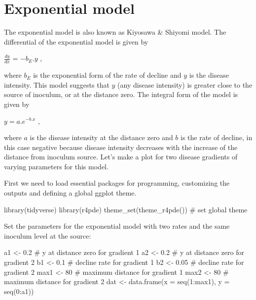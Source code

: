 \documentclass[
  letterpaper,
]{book}
\newenvironment{Shaded}{\begin{snugshade}}{\end{snugshade}}
\newcommand{\AttributeTok}[1]{\textcolor[rgb]{0.40,0.45,0.13}{#1}}
\newcommand{\CommentTok}[1]{\textcolor[rgb]{0.37,0.37,0.37}{#1}}
\newcommand{\DecValTok}[1]{\textcolor[rgb]{0.68,0.00,0.00}{#1}}
\newcommand{\FloatTok}[1]{\textcolor[rgb]{0.68,0.00,0.00}{#1}}
\newcommand{\FunctionTok}[1]{\textcolor[rgb]{0.28,0.35,0.67}{#1}}
\newcommand{\NormalTok}[1]{\textcolor[rgb]{0.00,0.23,0.31}{#1}}
\newcommand{\OtherTok}[1]{\textcolor[rgb]{0.00,0.23,0.31}{#1}}
\newcommand{\SpecialCharTok}[1]{\textcolor[rgb]{0.37,0.37,0.37}{#1}}
\begin{document}
\hypertarget{exponential-model}{%
\section{Exponential model}\label{exponential-model}}

The exponential model is also known as Kiyosawa \& Shiyomi model. The
differential of the exponential model is given by

\(\frac{dy}{dx}\) = \(-b_{E}.y\) ,

where \(b_{E}\) is the exponential form of the rate of decline and \(y\)
is the disease intensity. This model suggests that \(y\) (any disease
intensity) is greater close to the source of inoculum, or at the
distance zero. The integral form of the model is given by

\(y = a . e^{-b.x}\) ,

where \(a\) is the disease intensity at the distance zero and \(b\) is
the rate of decline, in this case negative because disease intensity
decreases with the increase of the distance from inoculum source. Let's
make a plot for two disease gradients of varying parameters for this
model.

First we need to load essential packages for programming, customizing
the outputs and defining a global ggplot theme.

\begin{Shaded}
\begin{Highlighting}[]
\FunctionTok{library}\NormalTok{(tidyverse)}
\FunctionTok{library}\NormalTok{(r4pde)}
\FunctionTok{theme\_set}\NormalTok{(}\FunctionTok{theme\_r4pde}\NormalTok{()) }\CommentTok{\# set global theme}
\end{Highlighting}
\end{Shaded}

Set the parameters for the exponential model with two rates and the same
inoculum level at the source:

\begin{Shaded}
\begin{Highlighting}[]
\NormalTok{a1 }\OtherTok{\textless{}{-}} \FloatTok{0.2} \CommentTok{\# y at distance zero for gradient 1}
\NormalTok{a2 }\OtherTok{\textless{}{-}} \FloatTok{0.2} \CommentTok{\# y at distance zero for gradient 2}
\NormalTok{b1 }\OtherTok{\textless{}{-}} \FloatTok{0.1} \CommentTok{\# decline rate for gradient 1}
\NormalTok{b2 }\OtherTok{\textless{}{-}} \FloatTok{0.05} \CommentTok{\# decline rate for gradient 2}
\NormalTok{max1 }\OtherTok{\textless{}{-}} \DecValTok{80} \CommentTok{\# maximum distance for gradient 1}
\NormalTok{max2 }\OtherTok{\textless{}{-}} \DecValTok{80} \CommentTok{\# maximum distance for gradient 2}
\NormalTok{dat }\OtherTok{\textless{}{-}} \FunctionTok{data.frame}\NormalTok{(}\AttributeTok{x =} \FunctionTok{seq}\NormalTok{(}\DecValTok{1}\SpecialCharTok{:}\NormalTok{max1), }\AttributeTok{y =} \FunctionTok{seq}\NormalTok{(}\DecValTok{0}\SpecialCharTok{:}\NormalTok{a1))}
\end{Highlighting}
\end{Shaded}
\end{document}
